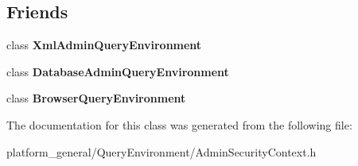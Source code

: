 \subsection*{\-Friends}
\begin{DoxyCompactItemize}
\item 
\hypertarget{classgeneral__server_1_1AdminSecurityContext_a4d8d548c7ae7528351a8aea8721baf3e}{class {\bfseries \-Xml\-Admin\-Query\-Environment}}\label{classgeneral__server_1_1AdminSecurityContext_a4d8d548c7ae7528351a8aea8721baf3e}

\item 
\hypertarget{classgeneral__server_1_1AdminSecurityContext_a16af9e43d49ba2b4c428e8e44c613d72}{class {\bfseries \-Database\-Admin\-Query\-Environment}}\label{classgeneral__server_1_1AdminSecurityContext_a16af9e43d49ba2b4c428e8e44c613d72}

\item 
\hypertarget{classgeneral__server_1_1AdminSecurityContext_a2bf654bbce4555ac6bb41fc5fd90ac59}{class {\bfseries \-Browser\-Query\-Environment}}\label{classgeneral__server_1_1AdminSecurityContext_a2bf654bbce4555ac6bb41fc5fd90ac59}

\end{DoxyCompactItemize}


\-The documentation for this class was generated from the following file\-:\begin{DoxyCompactItemize}
\item 
platform\-\_\-general/\-Query\-Environment/\-Admin\-Security\-Context.\-h\end{DoxyCompactItemize}
